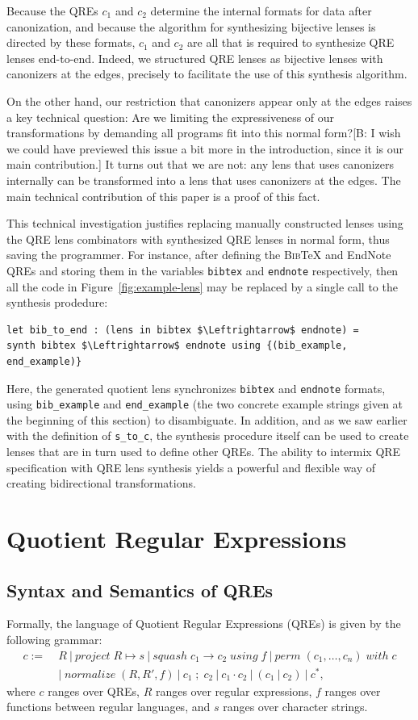 \documentclass[acmsmall,review,anonymous]{acmart}
\newcommand{\FINISH}[3]{\ifdraft\textcolor{#1}{[#2: #3]}\fi}
\newcommand{\bcp}[1]{\FINISH{dkred}{B}{#1}}
\newcommand{\kw}[1]{\ensuremath{\mathit{#1}}}
\newcommand{\project}[2]{\ensuremath{\kw{project} \; #1 \mapsto #2}}
\newcommand{\squash}[3]{\ensuremath{\kw{squash} \; #1 \rightarrow #2\; \kw{using} \; #3}}
\newcommand{\perm}[2]{\ensuremath{\kw{perm}\; (#1)\; \kw{with}\; #2}}
\newcommand{\normalize}[3]{\ensuremath{\kw{normalize} \; (#1, #2, #3)}}
\newcommand{\sep}{\ensuremath{\ | \ }}
\newcommand{\bibtex}{\textsc{Bib}\TeX{}}
\newcommand{\semicolon}{\ensuremath{\; ; \;}}
\newcommand{\cd}[1]{\lstinline[backgroundcolor=\color{white}]$#1$}
\begin{document}
Because the QREs $c_1$ and $c_2$ determine the internal formats for data after
canonization, and because the algorithm for synthesizing bijective lenses is
directed by these formats, $c_1$ and $c_2$ are all that is required to
synthesize QRE lenses end-to-end. Indeed, we structured QRE lenses as bijective
lenses with canonizers at the edges, precisely to facilitate the use of this
synthesis algorithm.

On the other hand, our restriction that canonizers appear only at the edges
raises a key technical question:  Are we limiting the expressiveness of our
transformations by demanding all programs fit into this normal form?\bcp{I wish
we could have previewed this issue a bit more in the introduction, since it is
our main contribution.}  It turns out that we are not: any lens that uses
canonizers internally can be transformed into a lens that uses canonizers at
the edges. The main technical contribution of this paper is a proof of this
fact.

This technical investigation justifies replacing manually constructed lenses
using the QRE lens combinators with synthesized QRE lenses in normal form, thus
saving the programmer. For instance, after defining the \bibtex{} and EndNote
QREs and storing them in the variables \cd{bibtex} and \cd{endnote}
respectively, then all the code in Figure~\ref{fig:example-lens} may be
replaced by a single call to the synthesis prodedure:

\begin{lstlisting}
let bib_to_end : (lens in bibtex $\Leftrightarrow$ endnote) =
synth bibtex $\Leftrightarrow$ endnote using {(bib_example, end_example)}
\end{lstlisting}
\noindent Here, the generated  quotient lens synchronizes \cd{bibtex} and
\cd{endnote} formats, using \cd{bib_example} and \cd{end_example} (the two
concrete example strings given at the beginning of this section) to
disambiguate. In addition, and as we saw earlier with the definition of
\cd{s_to_c}, the synthesis procedure itself can be used to create lenses that
are in turn used to define other QREs.  The ability to intermix QRE
specification with QRE lens synthesis yields a powerful and flexible way of
creating bidirectional transformations.

\section{Quotient Regular Expressions}
\label{QRE}
\subsection{Syntax and Semantics of QREs}
Formally, the language of Quotient Regular Expressions (QREs) is given by the
following grammar:
\begin{align*}
c := \; &R \sep \project{R}{s} \sep \squash{c_1}{c_2}{f} \sep
\perm{c_1, \ldots, c_n}{c} \\
& | \; \normalize{R}{R'}{f} \sep c_1 \semicolon c_2 \sep c_1 \cdot c_2 \sep (c_1
\sep c_2) \sep c^*,
\end{align*}
where $c$ ranges over QREs, $R$ ranges over regular expressions, $f$ ranges over
functions between regular languages, and $s$ ranges over character strings.
\end{document}
